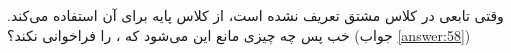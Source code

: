 \section{}
\paragraph{}\label{hint:330}
وقتی تابعی در کلاس مشتق تعریف نشده است،  از کلاس پایه برای آن استفاده می‌کند. خب پس چه چیزی مانع این می‌شود که ،  را فراخوانی نکند؟ (جواب \ref{answer:58})